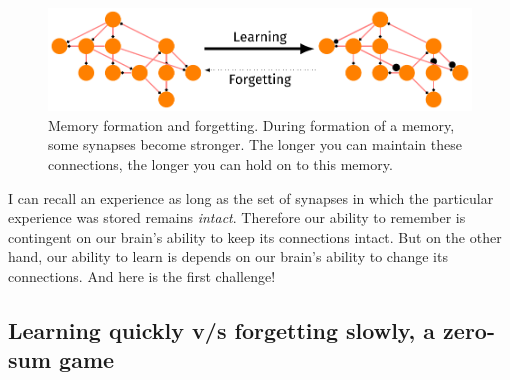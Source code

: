 \documentclass[]{resonance}
\begin{document}

\begin{figure}[!b] 
    \caption{Memory formation and forgetting. During formation of
    a memory, some synapses become stronger. The longer you can maintain these
    connections, the longer you can hold on to this memory.}
   \label{fig:engram}
   \includegraphics[width=\linewidth]{engram.pdf} 
\end{figure}

I can recall an experience as long as the set of synapses in which the
particular experience was stored remains \emph{intact}. Therefore our
ability to remember is contingent on our brain's ability to keep its connections
intact.  But on the other hand, our ability to learn is depends on our brain's
ability to change its connections. And here is the first challenge!

\subsection{Learning quickly v/s forgetting slowly, a zero-sum game}\label{subsec:zero_sum} 
\end{document}
